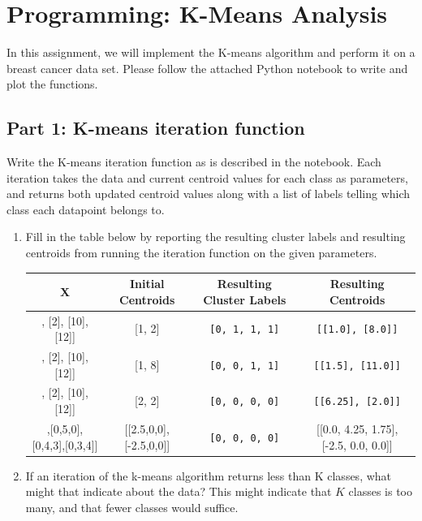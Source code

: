 \section{Programming: K-Means Analysis}
In this assignment, we will implement the K-means algorithm and perform it on a breast cancer data set. Please follow the attached Python notebook to write and plot the functions.
\subsection{Part 1: K-means iteration function}
Write the K-means iteration function as is described in the notebook. Each iteration takes the data and current centroid values for each class as parameters, and returns both updated centroid values along with a list of labels telling which class each datapoint belongs to.
\begin{enumerate}
    \item  Fill in the table below by reporting the resulting cluster labels and resulting centroids from running the iteration function on the given parameters.
            \begin{center}
            \begin{tabular}{|c|c|c|c|}
                \hline
                \textbf{X} & \textbf{Initial Centroids} & \textbf{Resulting Cluster Labels} & \textbf{Resulting Centroids}  \\
                 \hline
                [[1], [2], [10], [12]]  & [1, 2] & \verb|[0, 1, 1, 1]|& \verb|[[1.0], [8.0]]|  \\ \hline
                [[1], [2], [10], [12]]  & [1, 8] & \verb|[0, 0, 1, 1]| & \verb|[[1.5], [11.0]]| \\ \hline
               [[1], [2], [10], [12]]  & [2, 2] & \verb|[0, 0, 0, 0]| & \verb|[[6.25], [2.0]]|  \\ \hline
                [[0,5,0],[0,5,0],[0,4,3],[0,3,4]] & [[2.5,0,0],[-2.5,0,0]] & \verb|[0, 0, 0, 0]| & [[0.0, 4.25, 1.75], [-2.5, 0.0, 0.0]]  \\ \hline
                
            \end{tabular}
            \end{center}
        
    \item 
    If an iteration of the k-means algorithm returns less than K classes, what might that indicate about the data?
	\newline
	\newline
	This might indicate that $K$ classes is too many, and that fewer classes would suffice.

\end{enumerate}


